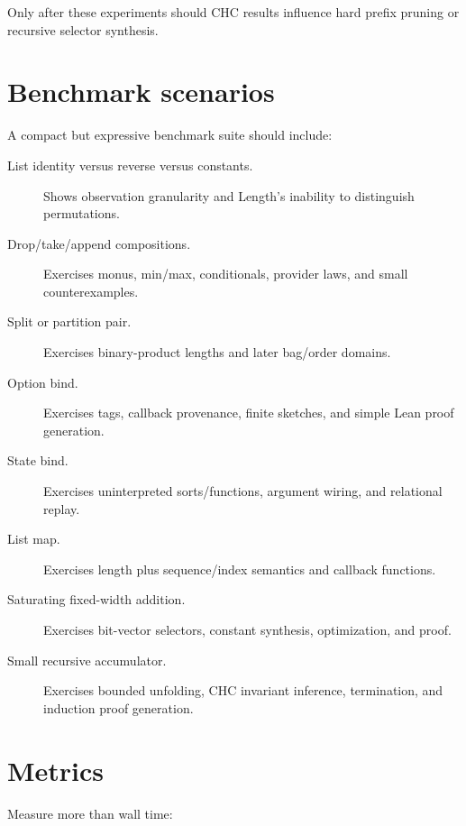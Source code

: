 \documentclass[10pt,letterpaper,oneside]{report}
\newcommand{\code}[1]{\texttt{\detokenize{#1}}}
\begin{document}
Only after these experiments should CHC results influence hard prefix pruning or recursive selector synthesis.

\section{Benchmark scenarios}

A compact but expressive benchmark suite should include:

\begin{description}
\item[List identity versus reverse versus constants.] Shows observation granularity and Length's inability to distinguish permutations.

\item[Drop/take/append compositions.] Exercises monus, min/max, conditionals, provider laws, and small counterexamples.

\item[Split or partition pair.] Exercises binary-product lengths and later bag/order domains.

\item[Option bind.] Exercises tags, callback provenance, finite sketches, and simple Lean proof generation.

\item[State bind.] Exercises uninterpreted sorts/functions, argument wiring, and relational replay.

\item[List map.] Exercises length plus sequence/index semantics and callback functions.

\item[Saturating fixed-width addition.] Exercises bit-vector selectors, constant synthesis, optimization, and \code{bv_decide} proof.

\item[Small recursive accumulator.] Exercises bounded unfolding, CHC invariant inference, termination, and induction proof generation.
\end{description}

\section{Metrics}

Measure more than wall time:
\end{document}

